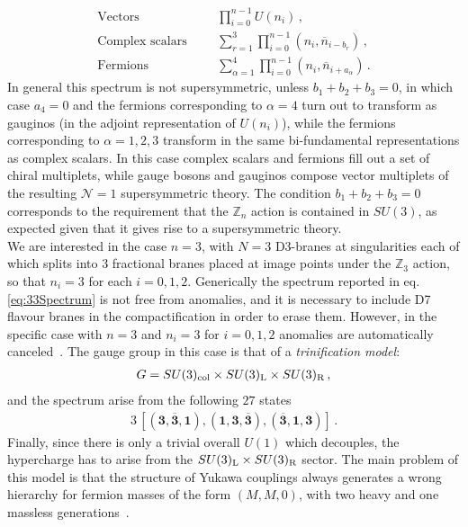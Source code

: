 \documentclass[12pt,a4paper]{book}
\def\nn{\nonumber}
\def\nn{\nonumber}
\begin{document}
\begin{align}
\label{eq:33Spectrum}
\text{Vectors}& &&\prod_{i=0}^{n-1} U(n_i) \,, \nn\\
\text{Complex scalars}& &&\sum_{r=1}^3 \prod_{i=0}^{n-1} \left(n_i, \overline{n}_{i-b_r}\right) \,,\\
\text{Fermions}& &&\sum_{\alpha=1}^4 \prod_{i=0}^{n-1} \left(n_i, \overline{n}_{i+a_{\alpha}}\right) \nn\,.
\end{align}
In general this spectrum is not supersymmetric, unless $b_1 + b_2 + b_3 = 0$, in which case $a_4 = 0$ and the fermions corresponding to $\alpha = 4$ turn out to transform as gauginos (in the adjoint representation of $U(n_i)$), while the fermions corresponding to $\alpha = 1,2,3$ transform in the same bi-fundamental representations as complex scalars. In this case complex scalars and fermions fill out a set of chiral multiplets, while gauge bosons and gauginos compose vector multiplets of the resulting $\mathcal{N} = 1$ supersymmetric theory. The condition $b_1 + b_2 + b_3 = 0$ corresponds to the requirement that the $\mathbb{Z}_n$ action is contained in $SU(3)$, as expected given that it gives rise to a supersymmetric theory.\\

We are interested in the case $n = 3$, with $N = 3$ D3-branes at singularities each of which splits into 3 fractional branes placed at image points under the $\mathbb{Z}_3$ action, so that $n_i = 3$ for each $i = 0, 1, 2$. Generically the spectrum reported in eq. \eqref{eq:33Spectrum} is not free from anomalies, and it is necessary to include D7 flavour branes in the compactification in order to erase them. However, in the specific case with $n = 3$ and $n_i = 3$ for $i = 0, 1, 2$ anomalies are automatically canceled~\cite{Aldazabal:2000sa}. The gauge group in this case is that of a \textit{trinification model}:
\begin{align}
\label{eq:TrinificationGaugeGroup}
G = SU(3)_{\rm col} \times SU(3)_{\rm L} \times SU(3)_{\rm R} \,,
\end{align}
and the spectrum arise from the following $27$ states
\begin{align}
\label{eq:TrinificationStates}
3 \, \left[(\mathbf{3},\mathbf{\overline{3}},\mathbf{1}), (\mathbf{1}, \mathbf{3},\mathbf{\overline{3}}), (\mathbf{\overline{3}}, \mathbf{1}, \mathbf{3})\right] \,.
\end{align}
Finally, since there is only a trivial overall $U(1)$ which decouples, the hypercharge has to arise from the $SU(3)_{\rm L} \times SU(3)_{\rm R}$ sector. The main problem of this model is that the structure of Yukawa couplings always generates a wrong hierarchy for fermion masses of the form $(M, M, 0)$, with two heavy and one massless generations~\cite{Conlon:2008wa, Maharana:2012tu}. 
\end{document}
